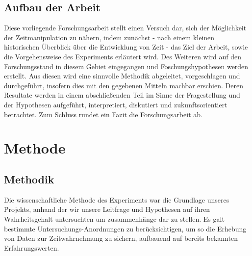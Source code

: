 \documentclass{Paper}
\begin{document}
\subsection{Aufbau der Arbeit}
Diese vorliegende Forschungsarbeit stellt einen Versuch dar, sich der Möglichkeit der Zeitmanipulation zu nähern, indem zunächst - nach einem kleinen historischen Überblick über die Entwicklung von Zeit - das Ziel der Arbeit, sowie die Vorgehensweise des Experiments erläutert wird. Des Weiteren wird auf den Forschungsstand in diesem Gebiet eingegangen und Foschungshypothesen werden erstellt. Aus diesen wird eine sinnvolle Methodik abgeleitet, vorgeschlagen und durchgeführt, insofern dies mit den gegebenen Mitteln machbar erschien. Deren Resultate werden in einem abschließenden Teil im Sinne der Fragestellung und der Hypothesen aufgeführt, interpretiert, diskutiert und zukunftsorientiert betrachtet. Zum Schluss rundet ein Fazit die Forschungsarbeit ab.



 
	
\section{Methode}
	\subsection{Methodik}
	\par
		Die wissenschaftliche Methode des Experiments war die Grundlage unseres Projekts, anhand der wir unsere Leitfrage und Hypothesen auf ihren Wahrheitsgehalt untersuchten um zusammenhänge dar zu stellen.
		Es galt bestimmte Untersuchungs-Anordnungen zu berücksichtigen, um so die Erhebung von Daten zur Zeitwahrnehmung zu sichern, aufbauend auf bereits bekannten Erfahrungswerten.
		
\end{document}
